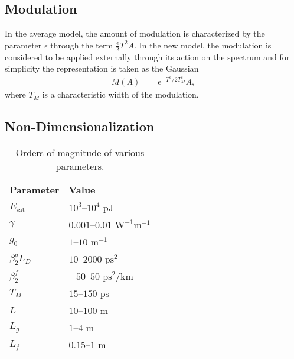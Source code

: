 \documentclass[%
 aps,
 jmp,%
 amsmath,amssymb,
 reprint,%
nofootinbib
]{revtex4-1}
\newcommand{\Es}{E_{\textrm{sat}}}
\newcommand{\FT}[1]{\mathcal{F}\left\{ #1 \right\}}
\begin{document}
\subsection{Modulation}
In the average model, the amount of modulation is characterized by the parameter $\epsilon$ through the term $\frac{\epsilon}{2}T^2 A$. In the new model, the modulation is considered to be applied externally through its action on the spectrum and for simplicity the representation is taken as the Gaussian
\begin{align}
	M(A) &= \textrm{e}^{-T^2 / 2 T_M^2} A,
\end{align}
where $T_M$ is a characteristic width of the modulation.%

\subsection{Non-Dimensionalization}

\begin{table}
\begin{center}
\begin{tabular}{|l|l|}
\hline
Parameter & Value \\
\hline
$\Es$ & $10^3$--$10^4 \text{ pJ}$ \\
$\gamma$ & $0.001$--$0.01 \text{ W}^{-1} \text{m}^{-1}$ \cite{agrawal2013} \\
$g_0$ & $1$--$10 \text{ m}^{-1}$ \\
$\beta_2^g L_D$ & $10$--$2000 \text{ ps}^2$ \cite{burgoyne2014, agrawal2013, litchinitser} \\
$\beta_2^f$ & $-50$--$50 \text{ ps}^2/ \text{km}$ \cite{burgoyne2014, agrawal2013} \\
$T_M$ & $15$--$150 \text{ ps}$ \cite{burgoyne2014} \\
$L$ & $10$--$100 \text{ m}$ \\
$L_g$ & $1$--$4 \text{ m}$ \cite{burgoyne2014, shtyrina, yarutkina} \\
$L_f$ & $0.15$--$1 \text{ m}$ \\
\hline
\end{tabular}
\caption{Orders of magnitude of various parameters.}
\label{tab:values}
\end{center}
\end{table}
\end{document}
